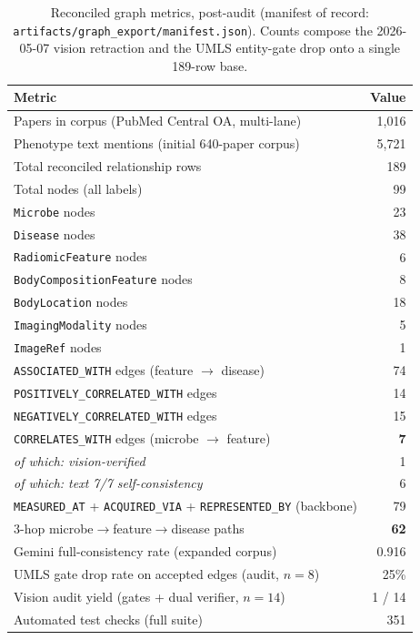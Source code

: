 \documentclass[10pt,twocolumn,letterpaper]{article}
\begin{document}
\begin{table}[t]
\centering
\small
\caption{Reconciled graph metrics, post-audit (manifest of record:
\texttt{artifacts/graph\_export/manifest.json}). Counts compose the
2026-05-07 vision retraction and the UMLS entity-gate drop onto a single
189-row base.}
\label{tab:graphmetrics}
\begin{tabular}{@{}p{}r@{}}
\toprule
\textbf{Metric} & \textbf{Value} \\
\midrule
Papers in corpus (PubMed Central OA, multi-lane) & 1{,}016 \\
Phenotype text mentions (initial 640-paper corpus) & 5{,}721 \\
Total reconciled relationship rows                & 189 \\
Total nodes (all labels)                          & 99 \\
\hspace{0.6em}\texttt{Microbe} nodes              & 23 \\
\hspace{0.6em}\texttt{Disease} nodes              & 38 \\
\hspace{0.6em}\texttt{RadiomicFeature} nodes      & 6 \\
\hspace{0.6em}\texttt{BodyCompositionFeature} nodes & 8 \\
\hspace{0.6em}\texttt{BodyLocation} nodes         & 18 \\
\hspace{0.6em}\texttt{ImagingModality} nodes      & 5 \\
\hspace{0.6em}\texttt{ImageRef} nodes             & 1 \\
\midrule
\texttt{ASSOCIATED\_WITH} edges (feature $\rightarrow$ disease) & 74 \\
\texttt{POSITIVELY\_CORRELATED\_WITH} edges & 14 \\
\texttt{NEGATIVELY\_CORRELATED\_WITH} edges & 15 \\
\texttt{CORRELATES\_WITH} edges (microbe $\rightarrow$ feature) & \textbf{7} \\
\hspace{0.6em}\emph{of which: vision-verified} & 1 \\
\hspace{0.6em}\emph{of which: text 7/7 self-consistency} & 6 \\
\texttt{MEASURED\_AT} + \texttt{ACQUIRED\_VIA} + \texttt{REPRESENTED\_BY} (backbone) & 79 \\
\midrule
3-hop microbe$\rightarrow$feature$\rightarrow$disease paths & \textbf{62} \\
Gemini full-consistency rate (expanded corpus) & 0.916 \\
UMLS gate drop rate on accepted edges (audit, $n{=}8$) & 25\% \\
Vision audit yield (gates + dual verifier, $n{=}14$) & 1 / 14 \\
\midrule
Automated test checks (full suite) & 351 \\
\bottomrule
\end{tabular}
\end{table}
\end{document}
